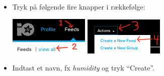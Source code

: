 \documentclass{ucph-handout}
\begin{document}
\begin{exercisebox}[adjusted title=Oprettelse på Adafruit]
\begin{itemize}
\item Tryk på følgende fire knapper i rækkefølge:

\hspace{1cm}
\includegraphics[width=0.3\textwidth]{illustrationer/adafruit_create_feed1}
\quad
\includegraphics[width=0.3\textwidth]{illustrationer/adafruit_create_feed2}

\item Indtast et navn, fx \textit{humidity} og tryk "`Create"'.
\end{itemize}

\end{exercisebox}
\end{document}
